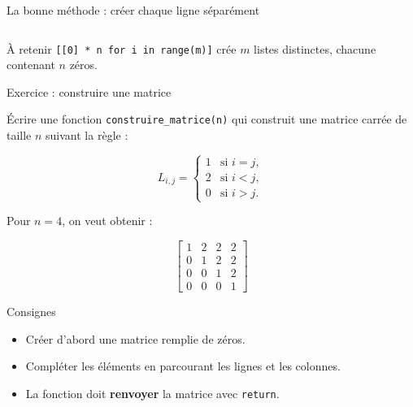 \documentclass[10pt]{beamer}
\begin{document}
\begin{frame}[fragile]{La bonne méthode : créer chaque ligne séparément}
\begin{columns}[T,onlytextwidth]
\end{columns}

\begin{block}{À retenir}
\texttt{[[0] * n for i in range(m)]} crée $m$ listes distinctes,
chacune contenant $n$ zéros.
\end{block}

\end{frame}


\begin{frame}[fragile]{Exercice : construire une matrice}

Écrire une fonction \texttt{construire\_matrice(n)} qui construit
une matrice carrée de taille $n$ suivant la règle :

\[
L_{i,j} =
\begin{cases}
1 & \text{si } i=j,\\
2 & \text{si } i<j,\\
0 & \text{si } i>j.
\end{cases}
\]

Pour $n=4$, on veut obtenir :

\[
\begin{bmatrix}
1 & 2 & 2 & 2\\
0 & 1 & 2 & 2\\
0 & 0 & 1 & 2\\
0 & 0 & 0 & 1
\end{bmatrix}
\]

\begin{block}{Consignes}
\begin{itemize}
    \item Créer d'abord une matrice remplie de zéros.
    \item Compléter les éléments en parcourant les lignes et les colonnes.
    \item La fonction doit \textbf{renvoyer} la matrice avec \texttt{return}.
\end{itemize}
\end{block}

\end{frame}
\end{document}

